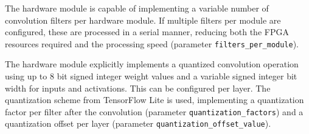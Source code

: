 The hardware module is capable of implementing a variable number of convolution filters per hardware module.
If multiple filters per module are configured, these are processed in a serial manner, reducing both the FPGA resources required and the processing speed (parameter \texttt{filters\_per\_module}).
 
The hardware module explicitly implements a quantized convolution operation using up to 8 bit signed integer weight values and a variable signed integer bit width for inputs and activations.
This can be configured per layer.
The quantization scheme from TensorFlow Lite \cite{tflite_website} is used, implementing a quantization factor per filter after the convolution (parameter \texttt{quantization\_factors}) and a quantization offset per layer (parameter \texttt{quantization\_offset\_value}).

